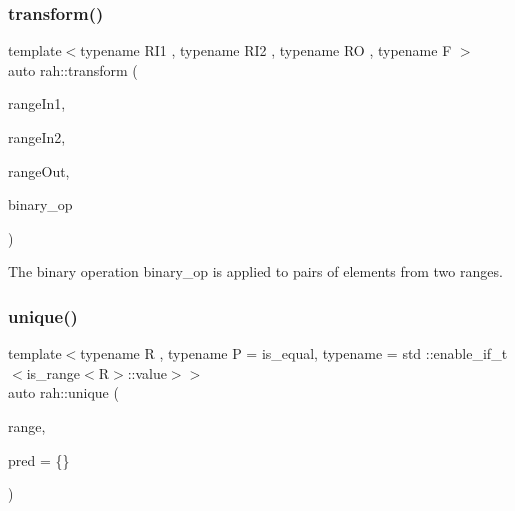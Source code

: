 \subsubsection{\texorpdfstring{transform()}{transform()}\hspace{0.1cm}{\footnotesize\ttfamily [2/2]}}
{\footnotesize\ttfamily template$<$typename R\+I1 , typename R\+I2 , typename RO , typename F $>$ \\
auto rah\+::transform (\begin{DoxyParamCaption}\item[{R\+I1 \&\&}]{range\+In1,  }\item[{R\+I2 \&\&}]{range\+In2,  }\item[{RO \&\&}]{range\+Out,  }\item[{F \&\&}]{binary\+\_\+op }\end{DoxyParamCaption})}



The binary operation binary\+\_\+op is applied to pairs of elements from two ranges. 


\begin{DoxyCodeInclude}{0}
\end{DoxyCodeInclude}
\mbox{\label{namespacerah_a7c4f0afb068c908600b357e111148df7}} 
\subsubsection{\texorpdfstring{unique()}{unique()}\hspace{0.1cm}{\footnotesize\ttfamily [1/2]}}
{\footnotesize\ttfamily template$<$typename R , typename P  = is\+\_\+equal, typename  = std \+::enable\+\_\+if\+\_\+t$<$is\+\_\+range$<$\+R$>$\+::value$>$$>$ \\
auto rah\+::unique (\begin{DoxyParamCaption}\item[{R \&\&}]{range,  }\item[{P \&\&}]{pred = {\ttfamily \{\}} }\end{DoxyParamCaption})}




